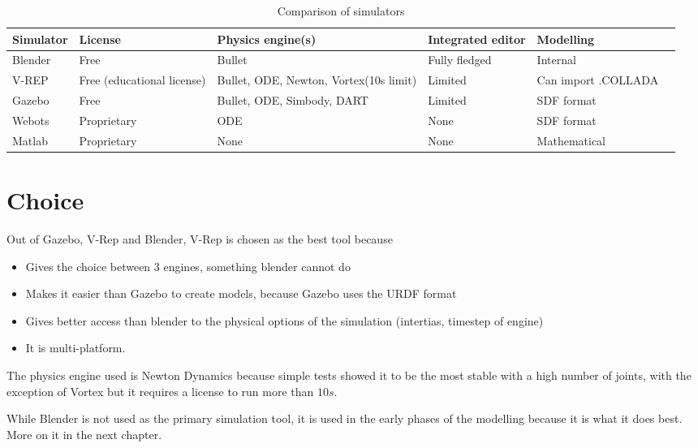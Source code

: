 \begin{table}[htp]
\center
\begin{tabularx}{\textwidth}{@{} l l X X X X @{}}
\toprule
\textbf{Simulator} & \textbf{License} & \textbf{Physics engine(s)} & \textbf{Integrated editor} & \textbf{Modelling}\\ 
\midrule
Blender & Free & Bullet & Fully fledged & Internal\\ 

V-REP & Free (educational license) & Bullet, ODE, Newton, Vortex(10s limit) & Limited & Can import .COLLADA\\

Gazebo & Free & Bullet, ODE, Simbody, DART & Limited & SDF format\\

Webots & Proprietary & ODE & None & SDF format\\

Matlab & Proprietary & None & None & Mathematical\\
\bottomrule
\end{tabularx}
\caption{Comparison of simulators}
\label{table:simulators_comp}
\end{table}

\section{Choice}
Out of Gazebo, V-Rep and Blender, V-Rep is chosen as the best tool because\begin{itemize}
\item Gives the choice between 3 engines, something blender cannot do
\item Makes it easier than Gazebo to create models, because Gazebo uses the URDF format
\item Gives better access than blender to the physical options of the simulation (intertias, timestep of engine)
\item It is multi-platform. 
\end{itemize}

The physics engine used is Newton Dynamics because simple tests showed it to be the most stable with a high number of joints, with the exception of Vortex but it requires a license to run more than $10s$.

While Blender is not used as the primary simulation tool, it is used in the early phases of the modelling because it is what it does best. More on it in the next chapter. 